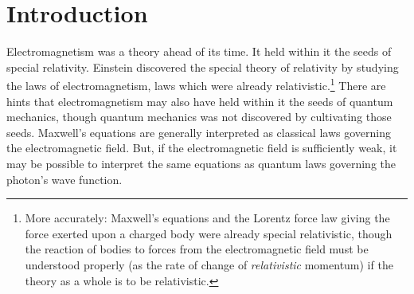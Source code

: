 \documentclass[12pt,secnumarabic,amsmath,amssymb,balancelastpage,nofootinbib]{article}
\begin{document}
\newpage
\tableofcontents
\newpage

\section{Introduction}

Electromagnetism was a theory ahead of its time.  It held within it the seeds of special relativity.  Einstein discovered the special theory of relativity by studying the laws of electromagnetism, laws which were already relativistic.\footnote{More accurately: Maxwell's equations and the Lorentz force law giving the force exerted upon a charged body were already special relativistic, though the reaction of bodies to forces from the electromagnetic field must be understood properly (as the rate of change of \emph{relativistic} momentum) if the theory as a whole is to be relativistic.}  There are hints that electromagnetism may also have held within it the seeds of quantum mechanics, though quantum mechanics was not discovered by cultivating those seeds.  Maxwell's equations are generally interpreted as classical laws governing the electromagnetic field.  But, if the electromagnetic field is sufficiently weak, it may be possible to interpret the same equations as quantum laws governing the photon's wave function.
\end{document}
